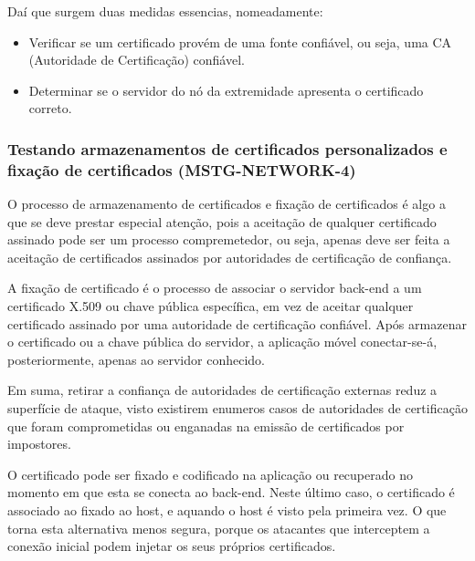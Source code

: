 \par Daí que surgem duas medidas essencias, nomeadamente:
\begin{itemize}
    \item Verificar se um certificado provém de uma fonte confiável, ou seja, uma CA (Autoridade de Certificação) confiável.
    \item Determinar se o servidor do nó da extremidade apresenta o certificado correto.
\end{itemize}




\subsubsection{Testando armazenamentos de certificados personalizados e fixação de certificados (MSTG-NETWORK-4)}\par
\hfill\par
\hfill\par
\par O processo de armazenamento de certificados e fixação de certificados é algo a que se deve prestar especial atenção, pois a aceitação de qualquer certificado assinado pode ser um processo compremetedor, ou seja, apenas deve ser feita a aceitação de certificados assinados por autoridades de certificação de confiança.

\par A fixação de certificado é o processo de associar o servidor back-end a um certificado X.509 ou chave pública específica, em vez de aceitar qualquer certificado assinado por uma autoridade de certificação confiável. Após armazenar o certificado ou a chave pública do servidor, a aplicação móvel conectar-se-á, posteriormente, apenas ao servidor conhecido. 

\par Em suma, retirar a confiança de autoridades de certificação externas reduz a superfície de ataque, visto existirem enumeros casos de autoridades de certificação que foram comprometidas ou enganadas na emissão de certificados por impostores.

\par O certificado pode ser fixado e codificado na aplicação ou recuperado no momento em que esta se conecta ao back-end. Neste último caso, o certificado é associado ao fixado ao host, e aquando o host é visto pela primeira vez. O que torna esta alternativa menos segura, porque os atacantes que interceptem a conexão inicial podem injetar os seus próprios certificados.






